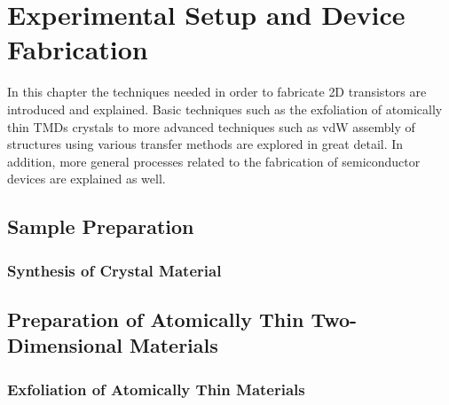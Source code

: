 \graphicspath{{./figs/chap2/}} %
\chapter{Experimental Setup and Device Fabrication}\label{chap:two}
In this chapter the techniques needed in order to fabricate \ac{2D} transistors
are introduced and explained. Basic techniques such as the exfoliation of atomically thin \acp{TMD} crystals 
to more advanced techniques such as \ac{vdW} assembly of structures using various transfer methods are explored
in great detail. In addition, more general processes related to the fabrication of semiconductor devices
are explained as well. 

\section{Sample Preparation}\label{sec:sample_prep}
\subsection{Synthesis of Crystal Material}\label{subsec:crystal_synthesis}

\section{Preparation of Atomically Thin Two-Dimensional Materials}\label{sec:prep_of_samples}
\subsection{Exfoliation of Atomically Thin Materials}\label{subsec:exfoliation}
